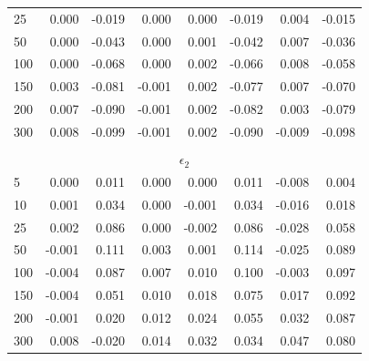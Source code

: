 \begin{table}
\begin{tabular}{lrrrrrrr}
   25 & 0.000 &-0.019 & 0.000 & 0.000 &-0.019 & 0.004 &-0.015 \\
   50 & 0.000 &-0.043 & 0.000 & 0.001 &-0.042 & 0.007 &-0.036 \\
  100 & 0.000 &-0.068 & 0.000 & 0.002 &-0.066 & 0.008 &-0.058 \\
  150 & 0.003 &-0.081 &-0.001 & 0.002 &-0.077 & 0.007 &-0.070 \\
  200 & 0.007 &-0.090 &-0.001 & 0.002 &-0.082 & 0.003 &-0.079 \\
  300 & 0.008 &-0.099 &-0.001 & 0.002 &-0.090 &-0.009 &-0.098 \\
\hline                                                                          
\\ \multicolumn{8}{c}{$\epsilon_2$} \\                                               
    5 & 0.000 & 0.011 & 0.000 & 0.000 & 0.011 &-0.008 & 0.004 \\
   10 & 0.001 & 0.034 & 0.000 &-0.001 & 0.034 &-0.016 & 0.018 \\
   25 & 0.002 & 0.086 & 0.000 &-0.002 & 0.086 &-0.028 & 0.058 \\
   50 &-0.001 & 0.111 & 0.003 & 0.001 & 0.114 &-0.025 & 0.089 \\
  100 &-0.004 & 0.087 & 0.007 & 0.010 & 0.100 &-0.003 & 0.097 \\
  150 &-0.004 & 0.051 & 0.010 & 0.018 & 0.075 & 0.017 & 0.092 \\
  200 &-0.001 & 0.020 & 0.012 & 0.024 & 0.055 & 0.032 & 0.087 \\
  300 & 0.008 &-0.020 & 0.014 & 0.032 & 0.034 & 0.047 & 0.080 \\
\end{tabular}
\label{tab_CIB}
\end{table}


\pagebreak


